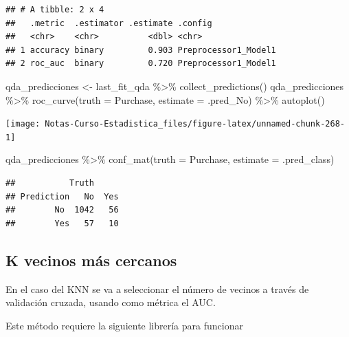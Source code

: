 \documentclass[
  12pt,
]{book}
\newenvironment{Shaded}{\begin{snugshade}}{\end{snugshade}}
\newcommand{\AttributeTok}[1]{\textcolor[rgb]{0.77,0.63,0.00}{#1}}
\newcommand{\FunctionTok}[1]{\textcolor[rgb]{0.00,0.00,0.00}{#1}}
\newcommand{\NormalTok}[1]{#1}
\newcommand{\OtherTok}[1]{\textcolor[rgb]{0.56,0.35,0.01}{#1}}
\newcommand{\SpecialCharTok}[1]{\textcolor[rgb]{0.00,0.00,0.00}{#1}}
\begin{document}
\begin{verbatim}
## # A tibble: 2 x 4
##   .metric  .estimator .estimate .config             
##   <chr>    <chr>          <dbl> <chr>               
## 1 accuracy binary         0.903 Preprocessor1_Model1
## 2 roc_auc  binary         0.720 Preprocessor1_Model1
\end{verbatim}

\begin{Shaded}
\begin{Highlighting}[]
\NormalTok{qda\_predicciones }\OtherTok{\textless{}{-}}\NormalTok{ last\_fit\_qda }\SpecialCharTok{\%\textgreater{}\%}
    \FunctionTok{collect\_predictions}\NormalTok{()}
\NormalTok{qda\_predicciones }\SpecialCharTok{\%\textgreater{}\%}
    \FunctionTok{roc\_curve}\NormalTok{(}\AttributeTok{truth =}\NormalTok{ Purchase, }\AttributeTok{estimate =}\NormalTok{ .pred\_No) }\SpecialCharTok{\%\textgreater{}\%}
    \FunctionTok{autoplot}\NormalTok{()}
\end{Highlighting}
\end{Shaded}

\begin{center}\texttt{[image: Notas-Curso-Estadistica\_files/figure-latex/unnamed-chunk-268-1]} \end{center}

\begin{Shaded}
\begin{Highlighting}[]
\NormalTok{qda\_predicciones }\SpecialCharTok{\%\textgreater{}\%}
    \FunctionTok{conf\_mat}\NormalTok{(}\AttributeTok{truth =}\NormalTok{ Purchase, }\AttributeTok{estimate =}\NormalTok{ .pred\_class)}
\end{Highlighting}
\end{Shaded}

\begin{verbatim}
##           Truth
## Prediction   No  Yes
##        No  1042   56
##        Yes   57   10
\end{verbatim}

\hypertarget{k-vecinos-muxe1s-cercanos}{%
\subsection{K vecinos más cercanos}\label{k-vecinos-muxe1s-cercanos}}

En el caso del KNN se va a seleccionar el número de vecinos a través de
validación cruzada, usando como métrica el AUC.

Este método requiere la siguiente librería para funcionar
\end{document}
